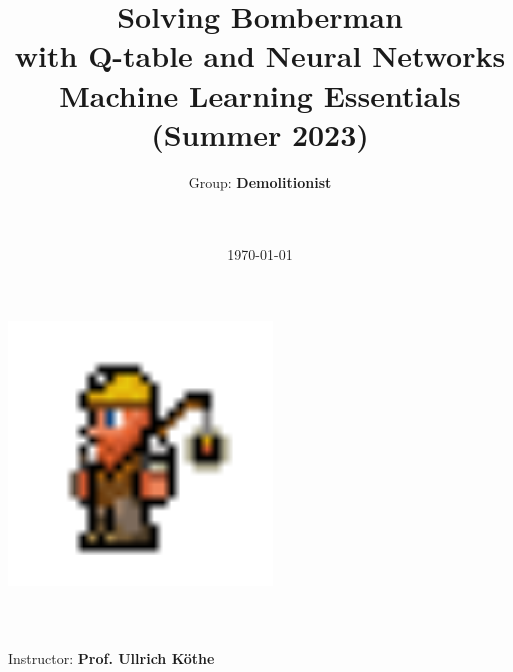 \title{\bf\huge Solving Bomberman \\ with Q-table and Neural Networks \\[0.5em] \normalfont \Large Machine Learning Essentials (Summer 2023)
        }

\author{\Large Group: \textbf{Demolitionist} \hspace{-0.5em} \large \vspace{1em}\\\hspace{1em}\\ \hspace{1em}\\[0.2em] \hspace{1em}}
\date{\large \today}

\makeatletter
    \begin{titlepage}
        \begin{center}
	   { \includegraphics[width=7cm]{avatar.png}}
	   {\ \\ \ \\}
        \vbox{}\vspace{1cm}
            {\@title }\\[4cm]%
            {\@author}\\[2.5cm]%
            {\large Instructor: \bf Prof. Ullrich Köthe\\ \ \\}
            \vfill\hfill {\@date\\}

        \end{center}
    \end{titlepage}
\makeatother
